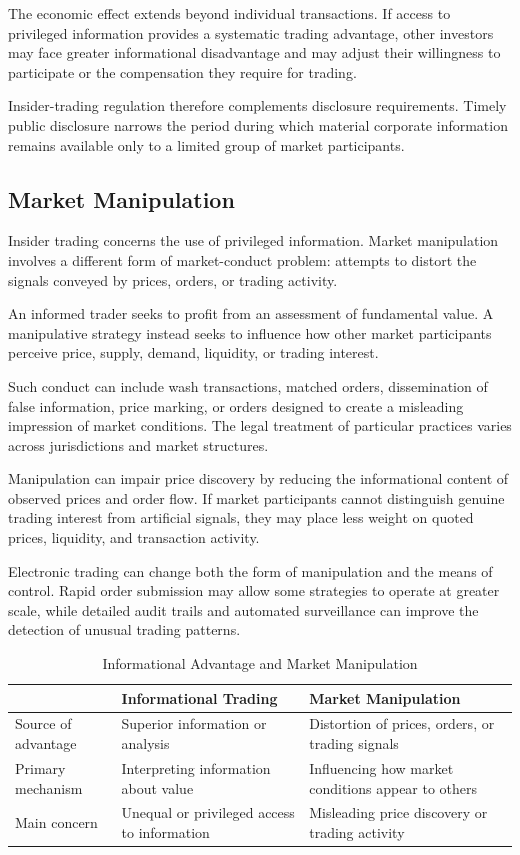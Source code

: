 The economic effect extends beyond individual transactions. If access to privileged information provides a systematic trading advantage, other investors may face greater informational disadvantage and may adjust their willingness to participate or the compensation they require for trading.

Insider-trading regulation therefore complements disclosure requirements. Timely public disclosure narrows the period during which material corporate information remains available only to a limited group of market participants.

\subsection{Market Manipulation}

Insider trading concerns the use of privileged information. Market manipulation involves a different form of market-conduct problem: attempts to distort the signals conveyed by prices, orders, or trading activity.

An informed trader seeks to profit from an assessment of fundamental value. A manipulative strategy instead seeks to influence how other market participants perceive price, supply, demand, liquidity, or trading interest.

Such conduct can include wash transactions, matched orders, dissemination of false information, price marking, or orders designed to create a misleading impression of market conditions. The legal treatment of particular practices varies across jurisdictions and market structures.

Manipulation can impair price discovery by reducing the informational content of observed prices and order flow. If market participants cannot distinguish genuine trading interest from artificial signals, they may place less weight on quoted prices, liquidity, and transaction activity.

Electronic trading can change both the form of manipulation and the means of control. Rapid order submission may allow some strategies to operate at greater scale, while detailed audit trails and automated surveillance can improve the detection of unusual trading patterns.

\begin{table}[H]
\centering
\caption{Informational Advantage and Market Manipulation}
\begin{tabularx}{0.92\textwidth}{lXX}
\toprule
 & \textbf{Informational Trading} & \textbf{Market Manipulation} \\
\midrule
Source of advantage 
& Superior information or analysis 
& Distortion of prices, orders, or trading signals \\

Primary mechanism
& Interpreting information about value
& Influencing how market conditions appear to others \\

Main concern
& Unequal or privileged access to information
& Misleading price discovery or trading activity \\
\bottomrule
\end{tabularx}
\end{table}

